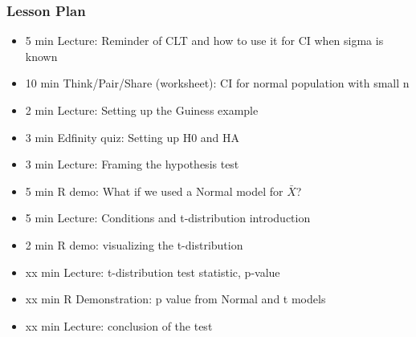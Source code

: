 \begin{frame}
    \frametitle{Lesson Plan}
    \begin{itemize}
        \item 5 min Lecture: Reminder of CLT and how to use it for CI when sigma is known
        \item 10 min Think/Pair/Share (worksheet): CI for normal population with small n
        \item 2 min Lecture: Setting up the Guiness example
        \item 3 min Edfinity quiz: Setting up H0 and HA
        \item 3 min Lecture: Framing the hypothesis test
        \item 5 min R demo: What if we used a Normal model for \(\bar{X}\)?
        \item 5 min Lecture: Conditions and t-distribution introduction
        \item 2 min R demo: visualizing the t-distribution
        \item xx min Lecture: t-distribution test statistic, p-value
        \item xx min R Demonstration: p value from Normal and t models
        \item xx min Lecture: conclusion of the test        
    \end{itemize}
\end{frame}
            

